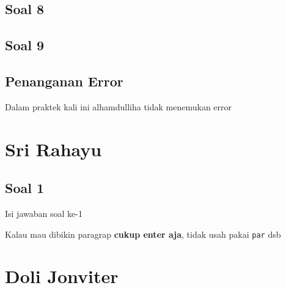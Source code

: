 \subsection{Soal 8}


\subsection{Soal 9}


\subsection{Penanganan Error}
Dalam praktek kali ini alhamdulliha tidak menemukan error

\section{Sri Rahayu}
\subsection{Soal 1}
Isi jawaban soal ke-1

Kalau mau dibikin paragrap \textbf{cukup enter aja}, tidak usah pakai \verb|par| dsb



\section{Doli Jonviter}
